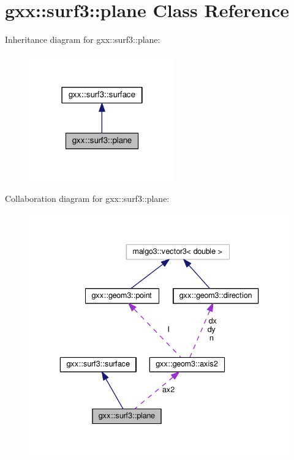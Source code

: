 \hypertarget{classgxx_1_1surf3_1_1plane}{}\section{gxx\+:\+:surf3\+:\+:plane Class Reference}
\label{classgxx_1_1surf3_1_1plane}


Inheritance diagram for gxx\+:\+:surf3\+:\+:plane\+:
\nopagebreak
\begin{figure}[H]
\begin{center}
\leavevmode
\includegraphics[width=178pt]{classgxx_1_1surf3_1_1plane__inherit__graph}
\end{center}
\end{figure}


Collaboration diagram for gxx\+:\+:surf3\+:\+:plane\+:
\nopagebreak
\begin{figure}[H]
\begin{center}
\leavevmode
\includegraphics[width=336pt]{classgxx_1_1surf3_1_1plane__coll__graph}
\end{center}
\end{figure}
